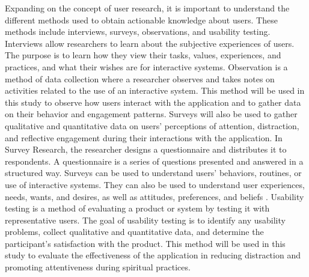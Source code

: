 \documentclass[12pt]{article}
\begin{document}
Expanding on the concept of user research, it is important to understand the different methods used to obtain actionable knowledge about users. These methods include interviews, surveys, observations, and usability testing. Interviews allow researchers to learn about the subjective experiences of users. The purpose is to learn how they view their tasks, values, experiences, and practices, and what their wishes are for interactive systems\cite{Hornbæk_Kristensson_Oulasvirta_2025}. Observation is a method of data collection where a researcher observes and takes notes on activities related to the use of an interactive system. This method will be used in this study to observe how users interact with the application and to gather data on their behavior and engagement patterns. Surveys will also be used to gather qualitative and quantitative data on users' perceptions of attention, distraction, and reflective engagement during their interactions with the application. In Survey Research, the researcher designs a questionnaire and distributes it to respondents. A questionnaire is a series of questions presented and answered in a structured way. Surveys can be used to understand users' behaviors, routines, or use of interactive systems. They can also be used to understand user experiences, needs, wants, and desires, as well as attitudes, preferences, and beliefs \cite{Hornbæk_Kristensson_Oulasvirta_2025}. Usability testing is a method of evaluating a product or system by testing it with representative users. The goal of usability testing is to identify any usability problems, collect qualitative and quantitative data, and determine the participant's satisfaction with the product. This method will be used in this study to evaluate the effectiveness of the application in reducing distraction and promoting attentiveness during spiritual practices.
\end{document}
